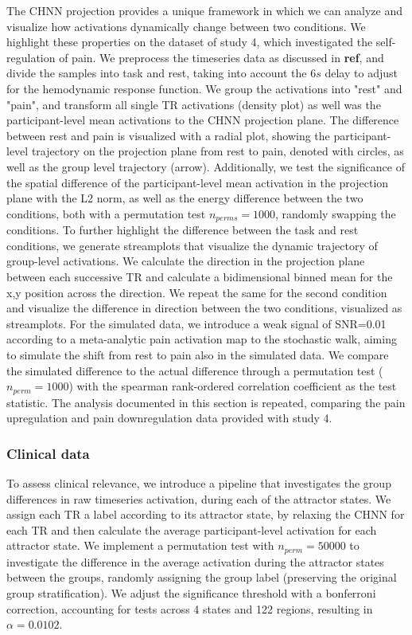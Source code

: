 \documentclass{article}
\begin{document}
The CHNN projection provides a unique framework in which we can analyze and visualize how activations dynamically
change between two conditions. We highlight these properties on the dataset of study 4, which investigated
the self-regulation of pain. We preprocess the timeseries data as discussed in \textbf{ref}, and divide the samples into
task and rest, taking into account the $6 s$ delay to adjust for the hemodynamic response function.
We group the activations into "rest" and "pain", and transform all single TR activations (density plot) as well was the
participant-level mean activations to the CHNN projection plane.
The difference between rest and pain is visualized with a radial plot, showing the participant-level trajectory on
the projection plane from rest to pain, denoted with circles, as well as the group level trajectory (arrow).
Additionally, we test the significance of the spatial difference of the participant-level mean activation in
the projection plane with the L2 norm,
as well as the energy difference between the two conditions, both with a permutation test $n_{perms}=1000$,
randomly swapping the conditions.
To further highlight the difference between the task and rest conditions, we generate streamplots that visualize the
dynamic trajectory of group-level activations.
We calculate the direction in the projection plane between each successive TR and calculate a bidimensional binned
mean for the x,y position across the direction.
We repeat the same for the second condition and visualize the difference in direction between the two conditions,
visualized as streamplots.
For the simulated data, we introduce a weak signal of SNR=0.01 according to a meta-analytic pain activation map
\citep{zunhammer2021meta} to the stochastic walk, aiming to simulate the shift from rest to pain also in the
simulated data. We compare the simulated difference to the actual difference through a permutation test
($n_{perm}=1000$) with the spearman rank-ordered correlation coefficient as the test statistic.
The analysis documented in this section is repeated, comparing the pain upregulation and pain downregulation
data provided with study 4.

\subsubsection{Clinical data}\label{Clinical data}

To assess clinical relevance, we introduce a pipeline that investigates the group differences in raw timeseries
activation, during each of the attractor states.
We assign each TR a label according to its attractor state, by relaxing the CHNN for each TR and then calculate the
average participant-level activation for each attractor state.
We implement a permutation test with $n_{perm}=50000$ to investigate the difference in the average activation during the
attractor states between the groups, randomly assigning the group label (preserving the original group stratification).
We adjust the significance threshold with a bonferroni correction, accounting for tests across 4 states and 122 regions,
resulting in $\alpha = 0.0102$.
\end{document}
